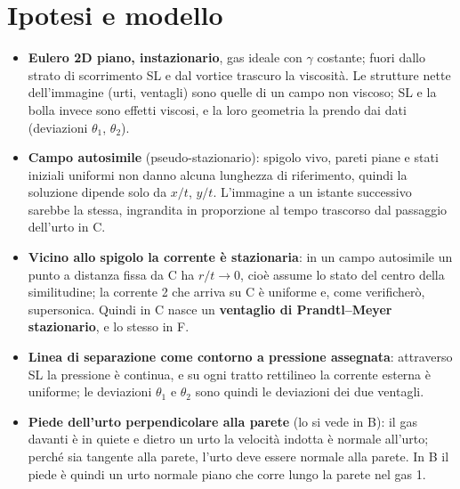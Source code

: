 \documentclass[11pt,a4paper]{article}
\begin{document}
\section{Ipotesi e modello}
\begin{itemize}
  \item \textbf{Eulero 2D piano, instazionario}, gas ideale con $\gamma$ costante; fuori dallo strato di scorrimento SL
  e dal vortice trascuro la viscosità. Le strutture nette dell'immagine (urti, ventagli) sono quelle di un campo non
  viscoso; SL e la bolla invece sono effetti viscosi, e la loro geometria la prendo dai dati (deviazioni $\theta_1$,
  $\theta_2$).
  \item \textbf{Campo autosimile} (pseudo-stazionario): spigolo vivo, pareti piane e stati iniziali uniformi non
  danno alcuna lunghezza di riferimento, quindi la soluzione dipende solo da $x/t$, $y/t$. L'immagine a un istante
  successivo sarebbe la stessa, ingrandita in proporzione al tempo trascorso dal passaggio dell'urto in C.
  \item \textbf{Vicino allo spigolo la corrente è stazionaria}: in un campo autosimile un punto a distanza fissa da C
  ha $r/t\to0$, cioè assume lo stato del centro della similitudine; la corrente 2 che arriva su C è uniforme e, come
  verificherò, supersonica. Quindi in C nasce un \textbf{ventaglio di Prandtl--Meyer stazionario}, e lo stesso in F.
  \item \textbf{Linea di separazione come contorno a pressione assegnata}: attraverso SL la pressione è continua, e su
  ogni tratto rettilineo la corrente esterna è uniforme; le deviazioni $\theta_1$ e $\theta_2$ sono quindi le
  deviazioni dei due ventagli.
  \item \textbf{Piede dell'urto perpendicolare alla parete} (lo si vede in B): il gas davanti è in quiete e dietro un
  urto la velocità indotta è normale all'urto; perché sia tangente alla parete, l'urto deve essere normale alla
  parete. In B il piede è quindi un urto normale piano che corre lungo la parete nel gas 1.
\end{itemize}

\end{document}

